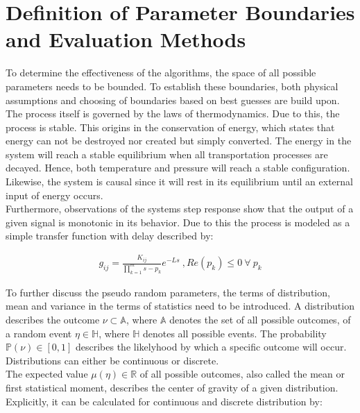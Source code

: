 \section{Definition of Parameter Boundaries and Evaluation Methods}%
\label{c:robustness:s:parameter}

To determine the effectiveness of the algorithms, the space of all possible parameters needs to be bounded. To establish these boundaries, both physical assumptions and choosing of boundaries based on best guesses are build upon.\\

The process itself is governed by the laws of thermodynamics. Due to this, the process is stable. This origins in the conservation of energy, which states that energy can not be destroyed nor created but simply converted. The energy in the system will reach a stable equilibrium when all transportation processes are decayed. Hence, both temperature and pressure will reach a stable configuration. Likewise, the system is causal since it will rest in its equilibrium until an external input of energy occurs.\\

Furthermore, observations of the systems step response show that the output of a given signal is monotonic in its behavior. Due to this the process is modeled as a simple transfer function with delay described by:

\begin{align*}
g_{ij} = \frac{K_{ij}}{\prod_{k=1}^{m} s - p_k} e^{-Ls} ~, Re\left(p_k\right) \leq 0 ~\forall~p_k 
\end{align*}

To further discuss the pseudo random parameters, the terms of distribution, mean and variance in the terms of statistics need to be introduced. A distribution describes the outcome $\nu \subset \mathbb{A}$, where $\mathbb{A}$ denotes the set of all possible outcomes, of a random event $\eta \in \mathbb{H}$, where $\mathbb{H}$ denotes all possible events. The probability $\mathbb{P} \left(\nu\right) \in \left[ 0, 1 \right]$ describes the likelyhood by which a specific outcome will occur. Distributions can either be continuous or discrete.\\

The expected value $\mu\left(\eta\right) \in \mathbb{R}$ of all possible outcomes, also called the mean or first statistical moment, describes the center of gravity of a given distribution. Explicitly, it can be calculated for continuous and discrete distribution by:

